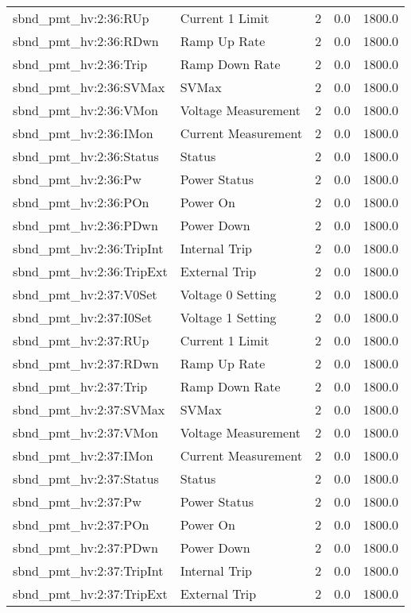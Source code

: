 \begin{center}
\begin{longtable}{l | l l l l }
sbnd\_pmt\_hv:2:36:RUp & Current 1 Limit & 2 & 0.0 & 1800.0\\ 
sbnd\_pmt\_hv:2:36:RDwn & Ramp Up Rate & 2 & 0.0 & 1800.0\\ 
sbnd\_pmt\_hv:2:36:Trip & Ramp Down Rate & 2 & 0.0 & 1800.0\\ 
sbnd\_pmt\_hv:2:36:SVMax & SVMax & 2 & 0.0 & 1800.0\\ 
sbnd\_pmt\_hv:2:36:VMon & Voltage Measurement & 2 & 0.0 & 1800.0\\ 
sbnd\_pmt\_hv:2:36:IMon & Current Measurement & 2 & 0.0 & 1800.0\\ 
sbnd\_pmt\_hv:2:36:Status & Status & 2 & 0.0 & 1800.0\\ 
sbnd\_pmt\_hv:2:36:Pw & Power Status & 2 & 0.0 & 1800.0\\ 
sbnd\_pmt\_hv:2:36:POn & Power On & 2 & 0.0 & 1800.0\\ 
sbnd\_pmt\_hv:2:36:PDwn & Power Down & 2 & 0.0 & 1800.0\\ 
sbnd\_pmt\_hv:2:36:TripInt & Internal Trip & 2 & 0.0 & 1800.0\\ 
sbnd\_pmt\_hv:2:36:TripExt & External Trip & 2 & 0.0 & 1800.0\\ 
sbnd\_pmt\_hv:2:37:V0Set & Voltage 0 Setting & 2 & 0.0 & 1800.0\\ 
sbnd\_pmt\_hv:2:37:I0Set & Voltage 1 Setting & 2 & 0.0 & 1800.0\\ 
sbnd\_pmt\_hv:2:37:RUp & Current 1 Limit & 2 & 0.0 & 1800.0\\ 
sbnd\_pmt\_hv:2:37:RDwn & Ramp Up Rate & 2 & 0.0 & 1800.0\\ 
sbnd\_pmt\_hv:2:37:Trip & Ramp Down Rate & 2 & 0.0 & 1800.0\\ 
sbnd\_pmt\_hv:2:37:SVMax & SVMax & 2 & 0.0 & 1800.0\\ 
sbnd\_pmt\_hv:2:37:VMon & Voltage Measurement & 2 & 0.0 & 1800.0\\ 
sbnd\_pmt\_hv:2:37:IMon & Current Measurement & 2 & 0.0 & 1800.0\\ 
sbnd\_pmt\_hv:2:37:Status & Status & 2 & 0.0 & 1800.0\\ 
sbnd\_pmt\_hv:2:37:Pw & Power Status & 2 & 0.0 & 1800.0\\ 
sbnd\_pmt\_hv:2:37:POn & Power On & 2 & 0.0 & 1800.0\\ 
sbnd\_pmt\_hv:2:37:PDwn & Power Down & 2 & 0.0 & 1800.0\\ 
sbnd\_pmt\_hv:2:37:TripInt & Internal Trip & 2 & 0.0 & 1800.0\\ 
sbnd\_pmt\_hv:2:37:TripExt & External Trip & 2 & 0.0 & 1800.0\\ 

\end{longtable}
\end{center}
